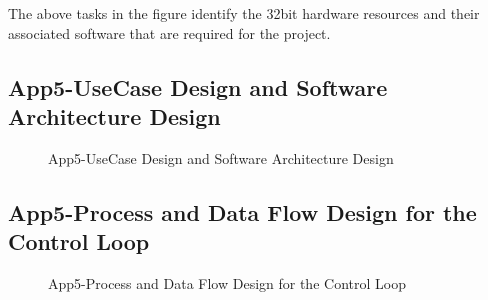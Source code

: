 The above tasks in the figure identify the 32bit hardware resources and their associated software that are required for the project.

\pagebreak
\subsection{App5-UseCase Design and Software Architecture Design}\label{sec:App5-UseCase Design}
\begin{figure}[htbp]
	\begin{center}
		\caption{App5-UseCase Design and Software Architecture Design}
		\label{fig:App5-05-Research-Implementation-Plan.png}
	\end{center}
\end{figure}


\pagebreak	
\subsection{App5-Process and Data Flow Design for the Control Loop}\label{sec:App5-Process-Flow Design}
\begin{figure}[htbp]
	\begin{center}
		\caption{App5-Process and Data Flow Design for the Control Loop}
		\label{fig:App5-06-Research-Implementation-Plan.png}
	\end{center}
\end{figure}

